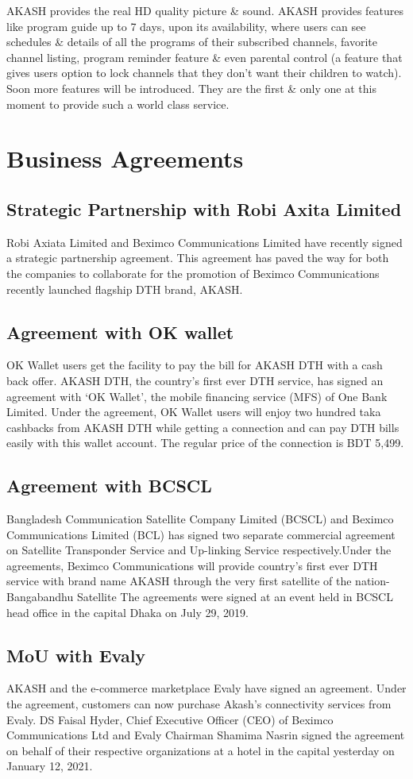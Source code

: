 \begin{spacing}{1.5}
AKASH provides the real HD quality picture \& sound. AKASH provides features like program guide up to 7 days, upon its availability, where users can see schedules \& details of all the programs of their subscribed channels, favorite channel listing, program reminder feature \& even parental control (a feature that gives users option to lock channels that they don't want their children to watch). Soon more features will be introduced. They are the first \& only one at this moment to provide such a world class service.

\section{Business Agreements}
\subsection{Strategic Partnership with Robi Axita Limited}
Robi Axiata Limited and Beximco Communications Limited have recently signed a strategic partnership agreement. This agreement has paved the way for both the companies to collaborate for the promotion of Beximco Communications recently launched flagship DTH brand, AKASH.
\subsection{Agreement with OK wallet}
OK Wallet users get the facility to pay the bill for AKASH DTH with a cash back offer. AKASH DTH, the country's first ever DTH service, has signed an agreement with ‘OK Wallet’, the mobile financing service (MFS) of One Bank Limited. Under the agreement, OK Wallet users will enjoy two hundred taka cashbacks from AKASH DTH while getting a connection and can pay DTH bills easily with this wallet account. The regular price of the connection is BDT 5,499.
\subsection{Agreement with BCSCL}
Bangladesh Communication Satellite Company Limited (BCSCL) and Beximco Communications Limited (BCL) has signed two separate commercial agreement on Satellite Transponder Service and Up-linking Service respectively.Under the agreements, Beximco Communications will provide country’s first ever DTH service with brand name AKASH through the very first satellite of the nation- Bangabandhu Satellite The agreements were signed at an event held in BCSCL head office in the capital Dhaka on July 29, 2019.
\subsection{MoU with Evaly}
AKASH and the e-commerce marketplace Evaly have signed an agreement. Under the agreement, customers can now purchase Akash's connectivity services from Evaly. DS Faisal Hyder, Chief Executive Officer (CEO) of Beximco Communications Ltd and Evaly Chairman Shamima Nasrin signed the agreement on behalf of their respective organizations at a hotel in the capital yesterday on January 12, 2021.


\end{spacing}
